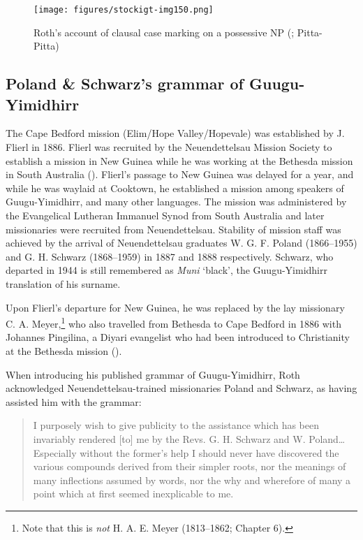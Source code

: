 \begin{figure}
\texttt{[image: figures/stockigt-img150.png]}
\caption{Roth’s account of clausal case marking on a possessive NP (\citeyear[7]{roth_ethnological_1897}; Pitta-Pitta)}
\label{bkm:Ref77770821}
\label{fig:key:204}
\end{figure}

\subsection{Poland \& Schwarz’s grammar of Guugu-Yimidhirr \citeyearpar{schwarz_koko_1900}}
\label{sec:key:10.1.2}\label{bkm:Ref516423826}\label{bkm:Ref516160134}\label{bkm:Ref514608157}\label{bkm:Ref514608023}\label{bkm:Ref514607997}
The Cape Bedford mission (Elim/Hope Valley/Hopevale) was established by J. Flierl in 1886. Flierl was recruited by the Neuendettelsau Mission Society to establish a mission in New Guinea while he was working at the Bethesda mission in South Australia (). Flierl’s passage to New Guinea was delayed for a year, and while he was waylaid at Cooktown, he established a mission among speakers of Guugu-Yimidhirr, and many other languages. The mission was administered by the Evangelical Lutheran Immanuel Synod from South Australia and later missionaries were recruited from Neuendettelsau. Stability of mission staff was achieved by the arrival of Neuendettelsau graduates W. G. F. Poland (1866--1955) and G. H. Schwarz (1868--1959) in 1887 and 1888 respectively. Schwarz, who departed in 1944 is still remembered as \textit{Muni} `black’, the Guugu-Yimidhirr translation of his surname.

Upon Flierl’s departure for New Guinea, he was replaced by the lay missionary C. A. Meyer,\footnote{Note that this is \textit{not} H. A. E. Meyer (1813--1862; Chapter 6).} who also travelled from Bethesda to Cape Bedford in 1886 with Johannes Pingilina, a Diyari evangelist who had been introduced to Christianity at the Bethesda mission ().

When introducing his published grammar of Guugu-Yimidhirr, Roth acknowledged Neuendettelsau-trained missionaries Poland and Schwarz, as having assisted him with the grammar:

\begin{quote}
I purposely wish to give publicity to the assistance which has been invariably rendered [to] me by the Revs. G. H. Schwarz and W. Poland…Especially without the former’s help I should never have discovered the various compounds derived from their simpler roots, nor the meanings of many inflections assumed by words, nor the why and wherefore of many a point which at first seemed inexplicable to me. \citep[preface]{roth_structure_1901}
\end{quote}

